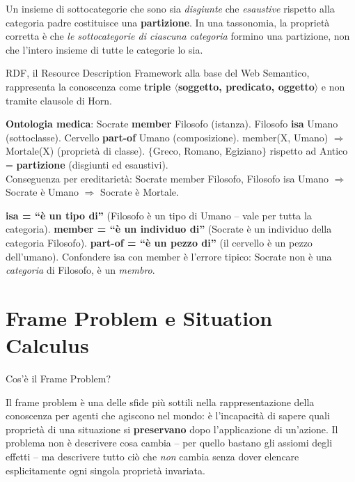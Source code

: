 \documentclass[12pt,a4paper]{article}
\begin{document}
Un insieme di sottocategorie che sono sia \emph{disgiunte} che \emph{esaustive} rispetto alla categoria padre costituisce una \textbf{partizione}. In una tassonomia, la proprietà corretta è che \emph{le sottocategorie di ciascuna categoria} formino una partizione, non che l'intero insieme di tutte le categorie lo sia.

RDF, il Resource Description Framework alla base del Web Semantico, rappresenta la conoscenza come \textbf{triple $\langle$soggetto, predicato, oggetto$\rangle$} e non tramite clausole di Horn.

\begin{esempiobox}
\textbf{Ontologia medica}: Socrate \textbf{member} Filosofo (istanza). Filosofo \textbf{isa} Umano (sottoclasse). Cervello \textbf{part-of} Umano (composizione). member(X, Umano) $\Rightarrow$ Mortale(X) (proprietà di classe). $\{$Greco, Romano, Egiziano$\}$ rispetto ad Antico = \textbf{partizione} (disgiunti ed esaustivi).\\[3pt]
Conseguenza per ereditarietà: Socrate member Filosofo, Filosofo isa Umano $\Rightarrow$ Socrate è Umano $\Rightarrow$ Socrate è Mortale.
\end{esempiobox}

\begin{ricordabox}
\textbf{isa = ``è un tipo di''} (Filosofo è un tipo di Umano -- vale per tutta la categoria). \textbf{member = ``è un individuo di''} (Socrate è un individuo della categoria Filosofo). \textbf{part-of = ``è un pezzo di''} (il cervello è un pezzo dell'umano). Confondere isa con member è l'errore tipico: Socrate non è una \emph{categoria} di Filosofo, è un \emph{membro}.
\end{ricordabox}

\section{Frame Problem e Situation Calculus}

\begin{domandabox}{Cos'è il Frame Problem?}
\end{domandabox}

Il frame problem è una delle sfide più sottili nella rappresentazione della conoscenza per agenti che agiscono nel mondo: è l'incapacità di sapere quali proprietà di una situazione si \textbf{preservano} dopo l'applicazione di un'azione. Il problema non è descrivere cosa cambia -- per quello bastano gli assiomi degli effetti -- ma descrivere tutto ciò che \emph{non} cambia senza dover elencare esplicitamente ogni singola proprietà invariata.
\end{document}
